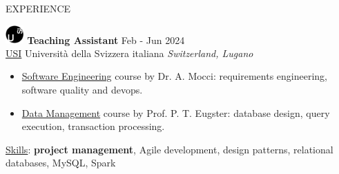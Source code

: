 \documentclass{cv} %
\def\intraexpvspace{0.15cm}
\def\titlelistvspace{-0.15cm}
\begin{document}
\vspace{-0cm}
\begin{rSection}{EXPERIENCE}


    \includegraphics[width=0.7cm, trim={0cm 10cm 0cm 0cm}]{usi-icon.png}
    \hspace*{0cm}\textbf{Teaching Assistant} \hfill Feb - Jun 2024\\
    \hspace*{0.85cm}\href{https://www.usi.ch/}{USI} Università della Svizzera italiana
    \hfill \textit{Switzerland, Lugano}
    \vspace{\titlelistvspace}\begin{itemize}
        \itemsep -3pt {}
        \item \href{https://search.usi.ch/it/corsi/35268192/software-atelier-4-software-engineering-project}{Software Engineering}
              course by Dr. A. Mocci: requirements engineering, software quality and devops.

        \item \href{https://search.usi.ch/it/corsi/35268184/data-management}{Data Management}
              course by Prof. P. T. Eugster: database design, query execution, transaction processing.
    \end{itemize}
    \vspace*{-0.1cm}\hspace*{0.5cm}\underline{Skills}: \textbf{project management}, Agile development, design patterns, relational databases, MySQL, Spark
    \vspace{\intraexpvspace}


\end{rSection}
\end{document}

